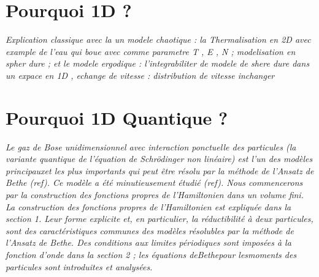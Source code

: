 \section*{Pourquoi 1D ?}

{\em Explication classique  avec la un modele chaotique : la Thermalisation en 2D avec example de l'eau qui boue avec comme parametre T , E , N ; modelisation en spher dure ; et le modele ergodique : l'integrabiliter de modele de shere dure dans un expace en 1D , echange de vitesse : distribution de vitesse inchanger}

\section*{Pourquoi 1D Quantique ?}

{\em Le gaz de Bose unidimensionnel avec interaction ponctuelle des particules (la variante quantique de l’équation de Schrödinger non linéaire) est l’un des modèles principauxet les plus importants qui peut être résolu par la méthode de l’Ansatz de Bethe ({ref}). Ce modèle a été minutieusement étudié ({ref}). Nous commencerons par la construction des fonctions propres de l’Hamiltonien dans un volume ﬁni. La construction des fonctions propres de l’Hamiltonien est expliquée dans la section 1. Leur forme explicite et, en particulier, la réductibilité à deux particules, sont des caractéristiques communes des modèles résolubles par la méthode de l’Ansatz de Bethe. Des conditions aux limites périodiques sont imposées à la fonction d’onde dans la section 2 ; les équations deBethepour lesmoments des particules sont introduites et analysées.}